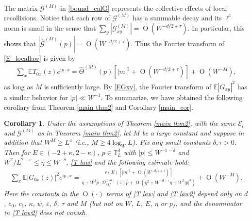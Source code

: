 \documentclass{article}
\newcommand{\1}{\mathds{1}}
\numberwithin{equation}{section}
\newcommand{\be}{\begin{equation}}
\newcommand{\ee}{\end{equation}}
\newcommand{\e}{{\varepsilon}}
\renewcommand{\cal}{\mathcal}
\newcommand{\wh}{\widehat}
\newcommand{\ii}{\mathrm{i}} %
\renewcommand{\leq}{\leqslant}
\renewcommand{\geq}{\geqslant}
\renewcommand{\le}{\leq}
\renewcommand{\ge}{\geq}
\newcommand{\E}{\mathbb{E}}
\DeclareMathOperator{\OO}{O}
\theoremstyle{plain} %
\newtheorem{corollary}[theorem]{Corollary}
\theoremstyle{remark}
\newcommand{\cor}{\color{red}}
\newcommand{\wtSdelta}{\Sigma}
\newcommand{\Sele}{{\mathcal E}}
\newcommand{\hty}[1]{{\cor (ht: #1) }}
\begin{document}
The matrix $\cal G^{(M)}$ in \eqref{bound_calG} represents the collective effects of local recollisions. Notice that each row of $\cal G^{(M)}$ has a summable decay and its $\ell^1$ norm is small in the sense that $\sum_y |\cal G_{x y}^{(M)}| =\OO(W^{-d/2+\tau})$. In particular, this shows that $|\wh {\cal G}^{(M)}(p)|=\OO(W^{-d/2+\tau})$. %
Thus the Fourier transform of \eqref{E_locallaw} is given by 
\be\label{T law}
\begin{split}
 \sum_x \E T_{0x} (z) e^{\ii p \cdot x}  = %
\wh \Theta^{(M)}(p)\left[|m|^2+\OO(W^{-d/2+\tau})\right] + \OO(W^{-M}) , %
\end{split} %
\ee
as long as $M$ is sufficiently large. 
By \eqref{EGxy}, the Fourier transform of $\E |G_{xy}|^2$ has a similar behavior for $|p|\ll W^{-1}$. 
To summarize, we have obtained the following corollary from Theorem \ref{main thm2} and Corollary \ref{main_cor}.
\begin{corollary}\label{main_cor2}
Under the assumptions of Theorem \ref{main thm2}, with the same $\Sele_l$ and $\cal G^{(M)}$ as in Theorem \ref{main thm2}, let $M$ be a large constant and suppose in addition that $W^M\ge L^4$ (i.e., $M\ge 4\log_W L$). Fix any small constants $\delta,\tau>0$. Then for $E\in (-2+\kappa,2-\kappa)$, $p\in \mathbb T_L^d$ with $|p|\le W^{-1-\delta}$ and $W^2/L^{2-\e}\le \eta \le W^{-\delta}$, \eqref{T law} and the following estimate hold:
\be\label{T law2}
\begin{split}
 \sum_x \E |G_{0x}(z)|^2 e^{\ii p \cdot x}  = \frac{r(E)\left[|m|^2+\OO(W^{-d/2+\tau})\right]}{\eta+ W^2 p\cdot \cal D_{eff}^{(M)}(z) p+ \OO\left( \eta^2 + W^{-d+\tau} \eta + W^3|p|^3 \right)} + \OO(W^{-M}) . %
\end{split} %
\ee
Here the constants in the $\OO(\cdot)$ terms of \eqref{T law} and \eqref{T law2} depend only on $d$, $c_0$, $c_1$, $\kappa$, $\psi$, $\e$, $\delta$, $\tau$ and $M$ (but not on $W$, $L$, $E$, $\eta$ or $p$), and the denominator in \eqref{T law2} does not vanish.
\end{corollary}
\end{document}
